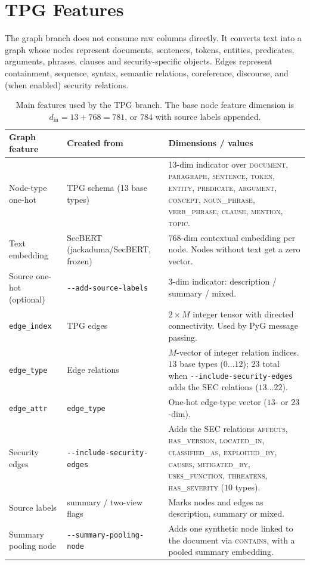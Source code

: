 \documentclass[11pt]{article}
\begin{document}
\section{TPG Features}

The graph branch does not consume raw columns directly. It converts
text into a graph whose nodes represent documents, sentences, tokens,
entities, predicates, arguments, phrases, clauses and security-specific
objects. Edges represent containment, sequence, syntax, semantic
relations, coreference, discourse, and (when enabled) security
relations.

\begin{table}[h]
\centering
\small
\begin{tabular}{p{}p{}p{}}
\toprule
Graph feature & Created from & Dimensions / values \\
\midrule
Node-type one-hot & TPG schema (13 base types) & 13-dim indicator over \textsc{document}, \textsc{paragraph}, \textsc{sentence}, \textsc{token}, \textsc{entity}, \textsc{predicate}, \textsc{argument}, \textsc{concept}, \textsc{noun\_phrase}, \textsc{verb\_phrase}, \textsc{clause}, \textsc{mention}, \textsc{topic}. \\
Text embedding & SecBERT (jackaduma/SecBERT, frozen) & 768-dim contextual embedding per node. Nodes without text get a zero vector. \\
Source one-hot (optional) & \verb|--add-source-labels| & 3-dim indicator: description / summary / mixed. \\
\verb|edge_index| & TPG edges & $2 \times M$ integer tensor with directed connectivity. Used by PyG message passing. \\
\verb|edge_type| & Edge relations & $M$-vector of integer relation indices. $13$ base types ($0\ldots 12$); $23$ total when \verb|--include-security-edges| adds the SEC relations ($13\ldots 22$). \\
\verb|edge_attr| & \verb|edge_type| & One-hot edge-type vector ($13$- or $23$-dim). \\
Security edges & \verb|--include-security-edges| & Adds the SEC relations \textsc{affects}, \textsc{has\_version}, \textsc{located\_in}, \textsc{classified\_as}, \textsc{exploited\_by}, \textsc{causes}, \textsc{mitigated\_by}, \textsc{uses\_function}, \textsc{threatens}, \textsc{has\_severity} ($10$ types). \\
Source labels & summary / two-view flags & Marks nodes and edges as description, summary or mixed. \\
Summary pooling node & \verb|--summary-pooling-node| & Adds one synthetic node linked to the document via \textsc{contains}, with a pooled summary embedding. \\
\bottomrule
\end{tabular}
\caption{Main features used by the TPG branch. The base node feature
dimension is $d_{\text{in}} = 13 + 768 = 781$, or $784$ with source
labels appended.}
\end{table}
\end{document}
